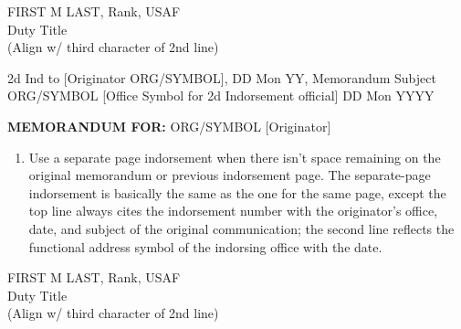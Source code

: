 \documentclass[12pt]{article}
\begin{document}
\begin{RaggedRight}
\vspace{1in} %
\noindent FIRST M LAST, Rank, USAF\\
Duty Title\\
(Align w/ third character of 2nd line)

\newpage
\newpage
\noindent 2d Ind to [Originator ORG/SYMBOL], DD Mon YY, Memorandum Subject\\

\noindent ORG/SYMBOL [Office Symbol for 2d Indorsement official] \hfill DD Mon YYYY

\noindent \textbf{MEMORANDUM FOR:} ORG/SYMBOL [Originator]

\begin{enumerate}
    \item Use a separate page indorsement when there isn’t space remaining on the original memorandum or previous indorsement page. The separate-page indorsement is basically the same as the one for the same page, except the top line always cites the indorsement number with the originator’s office, date, and subject of the original communication; the second line reflects the functional address symbol of the indorsing office with the date.
\end{enumerate}

\vspace{1in} %
\noindent FIRST M LAST, Rank, USAF\\
Duty Title\\
(Align w/ third character of 2nd line)

\end{RaggedRight}
\end{document}
